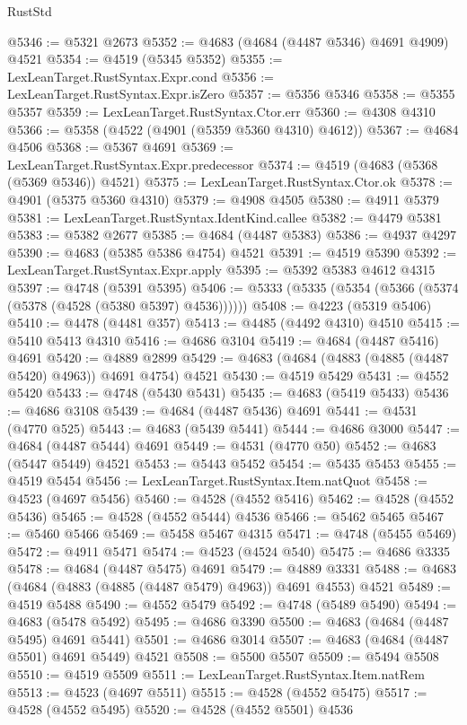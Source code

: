 \begin{lexlean}{RustStd}
\begin{coremodule}
@5346 := @5321 @2673
@5352 := @4683 (@4684 (@4487 @5346) @4691 @4909) @4521
@5354 := @4519 (@5345 @5352)
@5355 := LexLeanTarget.RustSyntax.Expr.cond
@5356 := LexLeanTarget.RustSyntax.Expr.isZero
@5357 := @5356 @5346
@5358 := @5355 @5357
@5359 := LexLeanTarget.RustSyntax.Ctor.err
@5360 := @4308 @4310
@5366 := @5358 (@4522 (@4901 (@5359 @5360 @4310) @4612))
@5367 := @4684 @4506
@5368 := @5367 @4691
@5369 := LexLeanTarget.RustSyntax.Expr.predecessor
@5374 := @4519 (@4683 (@5368 (@5369 @5346)) @4521)
@5375 := LexLeanTarget.RustSyntax.Ctor.ok
@5378 := @4901 (@5375 @5360 @4310)
@5379 := @4908 @4505
@5380 := @4911 @5379
@5381 := LexLeanTarget.RustSyntax.IdentKind.callee
@5382 := @4479 @5381
@5383 := @5382 @2677
@5385 := @4684 (@4487 @5383)
@5386 := @4937 @4297
@5390 := @4683 (@5385 @5386 @4754) @4521
@5391 := @4519 @5390
@5392 := LexLeanTarget.RustSyntax.Expr.apply
@5395 := @5392 @5383 @4612 @4315
@5397 := @4748 (@5391 @5395)
@5406 := @5333 (@5335 (@5354 (@5366 (@5374 (@5378 (@4528 (@5380 @5397) @4536))))))
@5408 := @4223 (@5319 @5406)
@5410 := @4478 (@4481 @357)
@5413 := @4485 (@4492 @4310) @4510
@5415 := @5410 @5413 @4310
@5416 := @4686 @3104
@5419 := @4684 (@4487 @5416) @4691
@5420 := @4889 @2899
@5429 := @4683 (@4684 (@4883 (@4885 (@4487 @5420) @4963)) @4691 @4754) @4521
@5430 := @4519 @5429
@5431 := @4552 @5420
@5433 := @4748 (@5430 @5431)
@5435 := @4683 (@5419 @5433)
@5436 := @4686 @3108
@5439 := @4684 (@4487 @5436) @4691
@5441 := @4531 (@4770 @525)
@5443 := @4683 (@5439 @5441)
@5444 := @4686 @3000
@5447 := @4684 (@4487 @5444) @4691
@5449 := @4531 (@4770 @50)
@5452 := @4683 (@5447 @5449) @4521
@5453 := @5443 @5452
@5454 := @5435 @5453
@5455 := @4519 @5454
@5456 := LexLeanTarget.RustSyntax.Item.natQuot
@5458 := @4523 (@4697 @5456)
@5460 := @4528 (@4552 @5416)
@5462 := @4528 (@4552 @5436)
@5465 := @4528 (@4552 @5444) @4536
@5466 := @5462 @5465
@5467 := @5460 @5466
@5469 := @5458 @5467 @4315
@5471 := @4748 (@5455 @5469)
@5472 := @4911 @5471
@5474 := @4523 (@4524 @540)
@5475 := @4686 @3335
@5478 := @4684 (@4487 @5475) @4691
@5479 := @4889 @3331
@5488 := @4683 (@4684 (@4883 (@4885 (@4487 @5479) @4963)) @4691 @4553) @4521
@5489 := @4519 @5488
@5490 := @4552 @5479
@5492 := @4748 (@5489 @5490)
@5494 := @4683 (@5478 @5492)
@5495 := @4686 @3390
@5500 := @4683 (@4684 (@4487 @5495) @4691 @5441)
@5501 := @4686 @3014
@5507 := @4683 (@4684 (@4487 @5501) @4691 @5449) @4521
@5508 := @5500 @5507
@5509 := @5494 @5508
@5510 := @4519 @5509
@5511 := LexLeanTarget.RustSyntax.Item.natRem
@5513 := @4523 (@4697 @5511)
@5515 := @4528 (@4552 @5475)
@5517 := @4528 (@4552 @5495)
@5520 := @4528 (@4552 @5501) @4536

\end{coremodule}
\end{lexlean}
